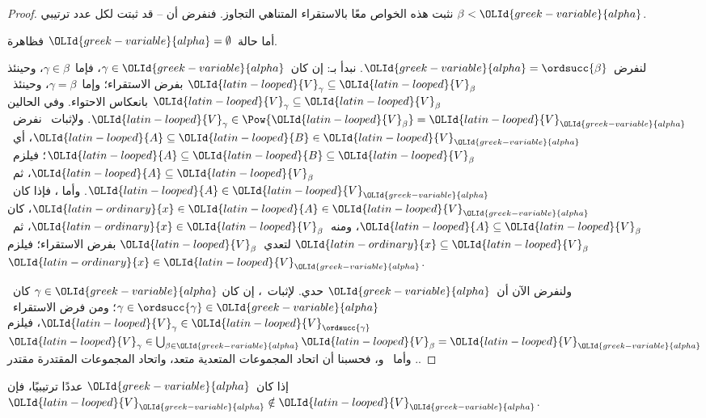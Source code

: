 \documentclass[../../../include/open-logic-section]{subfiles}
\begin{document}
\begin{proof}
نثبت هذه الخواص معًا بالاستقراء المتناهي التجاوز. فنفرض أن
-- قد ثبتت لكل عدد ترتيبي
$\beta < \OLId{greek-variable}{alpha}$.

أما حالة~$\OLId{greek-variable}{alpha} = \emptyset$ فظاهرة.

لنفرض~$\OLId{greek-variable}{alpha} = \ordsucc{\beta}$. نبدأ بـ:
إن كان~$\gamma \in \OLId{greek-variable}{alpha}$، فإما~$\gamma \in \beta$، وحينئذ
$\OLId{latin-looped}{V}_\gamma \subseteq \OLId{latin-looped}{V}_\beta$ بفرض الاستقراء؛ وإما~$\gamma = \beta$،
وحينئذ~$\OLId{latin-looped}{V}_\gamma \subseteq \OLId{latin-looped}{V}_\beta$ بانعكاس الاحتواء. وفي الحالين
$\OLId{latin-looped}{V}_\gamma \in \Pow{\OLId{latin-looped}{V}_\beta} = \OLId{latin-looped}{V}_\OLId{greek-variable}{alpha}$. ولإثبات~
نفرض~$\OLId{latin-looped}{A} \subseteq \OLId{latin-looped}{B} \in \OLId{latin-looped}{V}_\OLId{greek-variable}{alpha}$، أي~$\OLId{latin-looped}{A} \subseteq \OLId{latin-looped}{B} \subseteq \OLId{latin-looped}{V}_\beta$؛
فيلزم~$\OLId{latin-looped}{A} \subseteq \OLId{latin-looped}{V}_\beta$، ثم~$\OLId{latin-looped}{A} \in \OLId{latin-looped}{V}_\OLId{greek-variable}{alpha}$. وأما
، فإذا كان~$\OLId{latin-ordinary}{x} \in \OLId{latin-looped}{A} \in \OLId{latin-looped}{V}_\OLId{greek-variable}{alpha}$، كان
$\OLId{latin-looped}{A} \subseteq \OLId{latin-looped}{V}_\beta$، ومنه~$\OLId{latin-ordinary}{x} \in \OLId{latin-looped}{V}_\beta$، ثم~$\OLId{latin-ordinary}{x} \subseteq \OLId{latin-looped}{V}_\beta$
لتعدي~$\OLId{latin-looped}{V}_\beta$ بفرض الاستقراء؛ فيلزم~$\OLId{latin-ordinary}{x} \in \OLId{latin-looped}{V}_\OLId{greek-variable}{alpha}$.

ولنفرض الآن أن~$\OLId{greek-variable}{alpha}$ حدي. لإثبات~، إن كان
$\gamma \in \OLId{greek-variable}{alpha}$ كان~$\gamma \in \ordsucc{\gamma} \in \OLId{greek-variable}{alpha}$؛
ومن فرض الاستقراء~$\OLId{latin-looped}{V}_\gamma \in \OLId{latin-looped}{V}_{\ordsucc{\gamma}}$، فيلزم
$\OLId{latin-looped}{V}_\gamma \in \bigcup_{\beta \in \OLId{greek-variable}{alpha}} \OLId{latin-looped}{V}_\beta = \OLId{latin-looped}{V}_\OLId{greek-variable}{alpha}$.
وأما~ و، فحسبنا أن اتحاد
المجموعات المتعدية متعد، واتحاد المجموعات المقتدرة مقتدر.
\end{proof}

\begin{lem}
إذا كان~$\OLId{greek-variable}{alpha}$ عددًا ترتيبيًا، فإن~$\OLId{latin-looped}{V}_\OLId{greek-variable}{alpha} \notin \OLId{latin-looped}{V}_\OLId{greek-variable}{alpha}$.
\end{lem}
\end{document}
